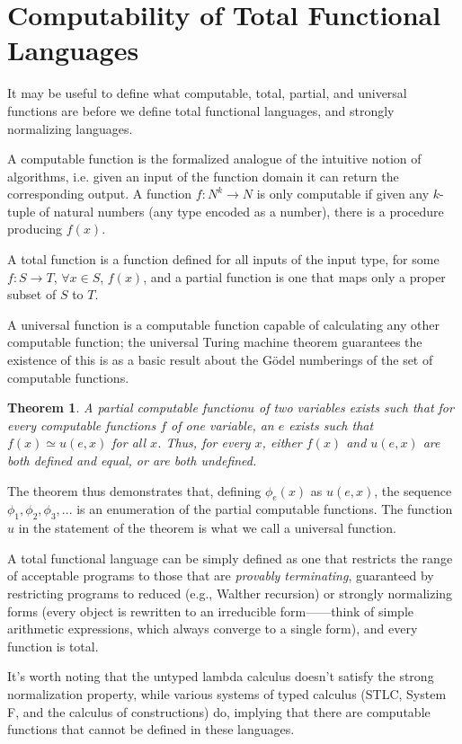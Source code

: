 \documentclass[conference]{IEEEtran}
\newtheorem{theorem}{Theorem}
\begin{document}
\section{Computability of Total Functional Languages}
It may be useful to define what computable, total, partial, and universal functions are before we define total functional languages, and strongly normalizing languages.

A computable function is the formalized analogue of the intuitive notion of algorithms, i.e. given an input of the function domain it can return the corresponding output. A function $f: N^k \to N$ is only computable if given any $k$-tuple of natural numbers (any type encoded as a number), there is a procedure producing $f(x)$.

A total function is a function defined for all inputs of the input type, for some $f: S \to T$, $\forall x \in S$, $f(x)$, and a partial function is one that maps only a proper subset of $S$ to $T$.

A universal function is a computable function capable of calculating any other computable function; the universal Turing machine theorem guarantees the existence of this is as a basic result about the Gödel numberings of the set of computable functions.

\begin{theorem}
    A partial computable function$u$ of two variables exists such that for every computable functions $f$ of one variable, an $e$ exists such that $f(x) \simeq u(e, x)$ for all $x$. Thus, for every $x$, either $f(x)$ and $u(e, x)$ are both defined and equal, or are both undefined.
\end{theorem}

The theorem thus demonstrates that, defining $\phi_e(x)$ as $u(e, x)$, the sequence $\phi_1, \phi_2, \phi_3, ...$ is an enumeration of the partial computable functions. The function $u$ in the statement of the theorem is what we call a universal function.

A total functional language can be simply defined as one that restricts the range of acceptable programs to those that are \textit{provably terminating}, guaranteed by restricting programs to reduced (e.g., Walther recursion) or strongly normalizing forms (every object is rewritten to an irreducible form——think of simple arithmetic expressions, which always converge to a single form), and every function is total.

It's worth noting that the untyped lambda calculus doesn't satisfy the strong normalization property, while various systems of typed calculus (STLC, System F, and the calculus of constructions) do, implying that there are computable functions that cannot be defined in these languages.
\end{document}
